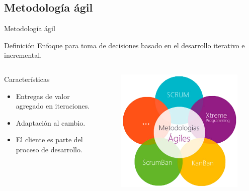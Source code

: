 \documentclass[10pt,xcolor=table]{beamer}
\begin{document}
\subsection{Metodología ágil}
\begin{frame}{Metodología ágil}
	\begin{alertblock}{Definición}
		Enfoque para toma de decisiones basado en el desarrollo iterativo e incremental.
	\end{alertblock}

	\begin{columns}[c,onlytextwidth]
		\begin{block}{Características}
			\begin{itemize}
	        	\item Entregas de valor agregado en iteraciones.
	        	\item Adaptación al cambio.
	        	\item El cliente es parte del proceso de desarrollo.
	    	\end{itemize}
		\end{block}
		\begin{figure}
		    \includegraphics[scale=0.32]{../Figuras/met_agiles}
		\end{figure}
  	\end{columns}
\end{frame}
\end{document}
